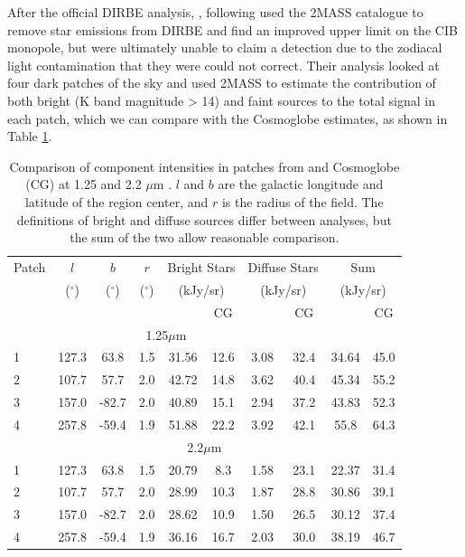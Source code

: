 \documentclass{aa}
\begin{document}
After the official DIRBE analysis, \cite{DIRBE2mass}, following \cite{gorjian} used the 2MASS catalogue to remove star emissions from DIRBE and find an improved upper limit on the CIB monopole, but were ultimately unable to claim a detection due to the zodiacal light contamination that they were could not correct. Their analysis looked at four dark patches of the sky and used 2MASS to estimate the contribution of both bright (K band magnitude > 14) and faint sources to the total signal in each patch, which we can compare with the Cosmoglobe estimates, as shown in Table \ref{tab:2mass}.

\begin{table}
    \centering
    \begin{tabular}{l c c c c c c c c c}
    \hline
    \hline
     Patch & $l$ & $b$ & $r$ & \multicolumn{2}{c}{Bright Stars} & \multicolumn{2}{c}{Diffuse Stars} & \multicolumn{2}{c}{Sum}\\ 
     & ($^{\circ}$) & ($^{\circ}$) & ($^{\circ}$) & \multicolumn{2}{c}{(kJy/sr)} & \multicolumn{2}{c}{(kJy/sr)} & \multicolumn{2}{c}{(kJy/sr)}\\
          &  & & & \cite{DIRBE2mass} & CG & \cite{DIRBE2mass} & CG  & \cite{DIRBE2mass} & CG\\
    \hline
    \hline
    \multicolumn{8}{c}{1.25$\mu$m}\\
    \hline
     1 \rule{0pt}{2ex} & 127.3 & 63.8 & 1.5 & 31.56 & 12.6 & 3.08 & 32.4 & 34.64 & 45.0\\
     2 & 107.7 & 57.7 & 2.0 & 42.72 & 14.8 & 3.62 & 40.4 & 45.34 & 55.2\\
     3 & 157.0 & -82.7 & 2.0 & 40.89 & 15.1 & 2.94 & 37.2 & 43.83 & 52.3\\
     4 & 257.8 & -59.4 & 1.9 & 51.88 & 22.2 & 3.92 & 42.1 & 55.8 & 64.3\\
     \hline
     \hline
     \multicolumn{10}{c}{2.2$\mu$m}\\
     \hline
     1 \rule{0pt}{2ex} & 127.3 & 63.8  & 1.5 & 20.79 & 8.3 & 1.58 & 23.1 & 22.37 & 31.4\\
     2 & 107.7 & 57.7 & 2.0 & 28.99 & 10.3 & 1.87 & 28.8 & 30.86 & 39.1\\
     3 & 157.0 & -82.7 & 2.0 & 28.62 & 10.9 & 1.50 & 26.5 & 30.12 & 37.4\\
     4 & 257.8 & -59.4 & 1.9 & 36.16 & 16.7 & 2.03 & 30.0 & 38.19 & 46.7\\
     \hline
    \end{tabular}
    \caption{Comparison of component intensities in patches from \cite{DIRBE2mass} and Cosmoglobe (CG) at 1.25 and 2.2 $\mu$m . $l$ and $b$ are the galactic longitude and latitude of the region center, and $r$ is the radius of the field. The definitions of bright and diffuse sources differ between analyses, but the sum of the two allow reasonable comparison.}
    \label{tab:2mass}
\end{table}
\end{document}
